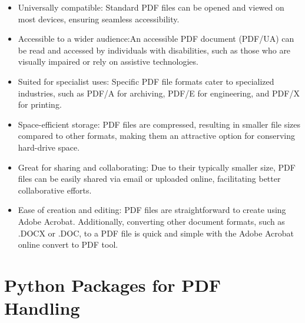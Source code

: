 \begin{itemize}
\item Universally compatible: Standard PDF files can be opened and viewed on most devices, ensuring seamless accessibility.

\item Accessible to a wider audience:An accessible PDF document (PDF/UA) can be read and accessed by individuals with disabilities, such as those who are visually impaired or rely on assistive technologies.

\item Suited for specialist uses: Specific PDF file formats cater to specialized industries, such as PDF/A for archiving, PDF/E for engineering, and PDF/X for printing.

\item Space-efficient storage: PDF files are compressed, resulting in smaller file sizes compared to other formats, making them an attractive option for conserving hard-drive space.

\item Great for sharing and collaborating: Due to their typically smaller size, PDF files can be easily shared via email or uploaded online, facilitating better collaborative efforts.

\item Ease of creation and editing: PDF files are straightforward to create using Adobe Acrobat. Additionally, converting other document formats, such as .DOCX or .DOC, to a PDF file is quick and simple with the Adobe Acrobat online convert to PDF tool.
\end{itemize}

\cite{ABBYY:2023}

\bigskip


\newpage
\section{Python Packages for PDF Handling}

